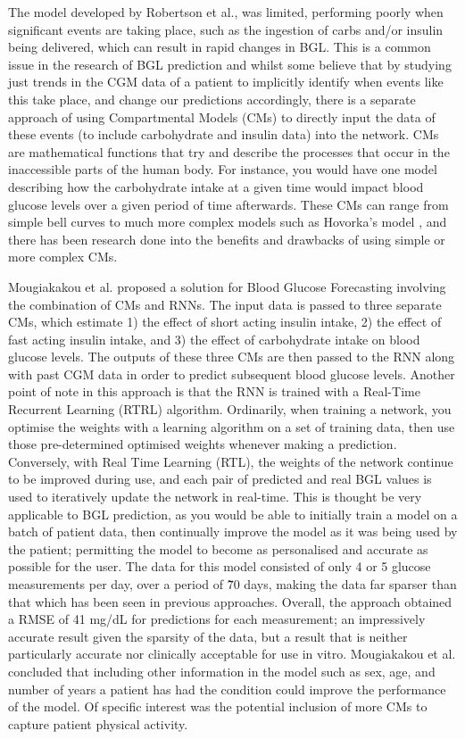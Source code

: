       The model developed by Robertson et al., was limited, performing poorly when significant events are taking place, such as the ingestion of carbs and/or insulin being delivered, which can result in rapid changes in BGL. This is a common issue in the research of BGL prediction and whilst some believe that by studying just trends in the CGM data of a patient to implicitly identify when events like this take place, and change our predictions accordingly, there is a separate approach of using Compartmental Models (CMs) \cite{CMS} to directly input the data of these events (to include carbohydrate and insulin data) into the network. CMs are mathematical functions that try and describe the processes that occur in the inaccessible parts of the human body. For instance, you would have one model describing how the carbohydrate intake at a given time would impact blood glucose levels over a given period of time afterwards. These CMs can range from simple bell curves to much more complex models such as Hovorka's model \cite{hovorka}, and there has been research done into the benefits and drawbacks of using simple or more complex CMs. 

      Mougiakakou et al. \cite{paper4} proposed a solution for Blood Glucose Forecasting involving the combination of CMs and RNNs. The input data is passed to three separate CMs, which estimate 1) the effect of short acting insulin intake, 2) the effect of fast acting insulin intake, and 3) the effect of carbohydrate intake on blood glucose levels. The outputs of these three CMs are then passed to the RNN along with past CGM data in order to predict subsequent blood glucose levels. Another point of note in this approach is that the RNN is trained with a Real-Time Recurrent Learning (RTRL) algorithm. Ordinarily, when training a network, you optimise the weights with a learning algorithm on a set of training data, then use those pre-determined optimised weights whenever making a prediction. Conversely, with Real Time Learning (RTL), the weights of the network continue to be improved during use, and each pair of predicted and real BGL values is used to iteratively update the network in real-time. This is thought be very applicable to BGL prediction, as you would be able to initially train a model on a batch of patient data, then continually improve the model as it was being used by the patient; permitting the model to become as personalised and accurate as possible for the user. The data for this model consisted of only 4 or 5 glucose measurements per day, over a period of \~70 days, making the data far sparser than that which has been seen in previous approaches. Overall, the approach obtained a RMSE of 41 mg/dL for predictions for each measurement; an impressively accurate result given the sparsity of the data, but a result that is neither particularly accurate nor clinically acceptable for use in vitro. Mougiakakou et al. \cite{paper4} concluded that including other information in the model such as sex, age, and number of years a patient has had the condition could improve the performance of the model. Of specific interest was the potential inclusion of more CMs to capture patient physical activity.

